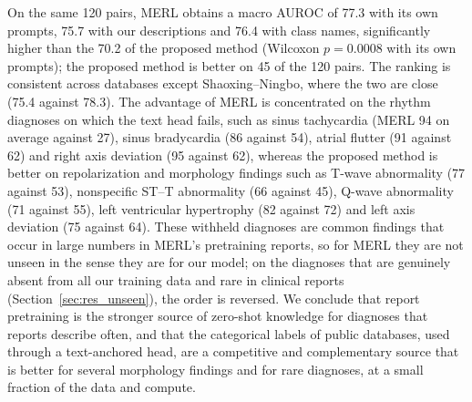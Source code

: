 On the same 120 pairs, MERL obtains a macro AUROC of 77.3 with its own prompts, 75.7 with our descriptions and 76.4 with class names, significantly higher than the 70.2 of the proposed method (Wilcoxon $p=0.0008$ with its own prompts); the proposed method is better on 45 of the 120 pairs. The ranking is consistent across databases except Shaoxing--Ningbo, where the two are close (75.4 against 78.3). The advantage of MERL is concentrated on the rhythm diagnoses on which the text head fails, such as sinus tachycardia (MERL 94 on average against 27), sinus bradycardia (86 against 54), atrial flutter (91 against 62) and right axis deviation (95 against 62), whereas the proposed method is better on repolarization and morphology findings such as T-wave abnormality (77 against 53), nonspecific ST--T abnormality (66 against 45), Q-wave abnormality (71 against 55), left ventricular hypertrophy (82 against 72) and left axis deviation (75 against 64). These withheld diagnoses are common findings that occur in large numbers in MERL's pretraining reports, so for MERL they are not unseen in the sense they are for our model; on the diagnoses that are genuinely absent from all our training data and rare in clinical reports (Section~\ref{sec:res_unseen}), the order is reversed. We conclude that report pretraining is the stronger source of zero-shot knowledge for diagnoses that reports describe often, and that the categorical labels of public databases, used through a text-anchored head, are a competitive and complementary source that is better for several morphology findings and for rare diagnoses, at a small fraction of the data and compute.

